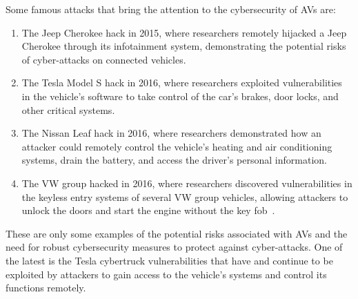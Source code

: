 Some famous attacks that bring the attention to the cybersecurity of AVs are:
\begin{enumerate}
    \item The Jeep Cherokee hack in 2015, where researchers remotely hijacked a Jeep Cherokee through its infotainment system, demonstrating the potential risks of cyber-attacks on connected vehicles\cite{miller2015remote}.
    \item The Tesla Model S hack in 2016, where researchers exploited vulnerabilities in the vehicle's software to take control of the car's brakes, door locks, and other critical systems\cite{tesla_hack}.
    \item The Nissan Leaf hack in 2016, where researchers demonstrated how an attacker could remotely control the vehicle's heating and air conditioning systems, drain the battery, and access the driver's personal information.
    \item The VW group hacked in 2016, where researchers discovered vulnerabilities in the keyless entry systems of several VW group vehicles, allowing attackers to unlock the doors and start the engine without the key fob~\cite{garcia2016lock}.
\end{enumerate}

These are only some examples of the potential risks associated with AVs and the need for robust cybersecurity measures to protect against cyber-attacks.
One of the latest is the Tesla cybertruck vulnerabilities that have and continue to be exploited by attackers to gain access to the vehicle's systems and control its functions remotely.
